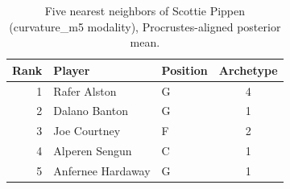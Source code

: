 \begin{table}[htbp]
  \centering\small
  \begin{tabular}{rllc}
    \toprule
    Rank & Player & Position & Archetype \\
    \midrule
    1 & Rafer Alston & G & 4 \\
    2 & Dalano Banton & G & 1 \\
    3 & Joe Courtney & F & 2 \\
    4 & Alperen Sengun & C & 1 \\
    5 & Anfernee Hardaway & G & 1 \\
    \bottomrule
  \end{tabular}
  \caption{Five nearest neighbors of Scottie Pippen (curvature_m5 modality), Procrustes-aligned posterior mean.}
  \label{tab:Scottie_Pippen_neighbors_curvature_m5}
\end{table}


